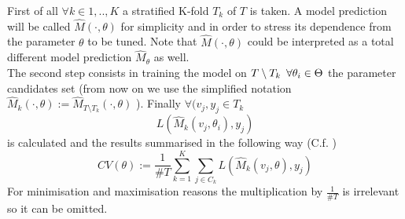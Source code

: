 \documentclass[a4paper,12pt]{article}
\begin{document}
First of all $\forall k \in 1, ..,K$ a stratified K-fold $T_{k}$ of $T$ is taken. A model prediction will be called $ \hat{M}(\cdot,\theta)$ for simplicity and in order to stress its dependence from the parameter $\theta$ to be tuned.
Note that $\hat{M}(\cdot,\theta)$ could be interpreted as a total different model prediction $\hat{M}_{\theta}$ as well.\\
The second step consists in training the model on $T \setminus T_{k} \enskip \forall \theta_{i} \in \Theta $ the parameter candidates set (from now on we use the simplified notation $ \hat{M}_{k}(\cdot,\theta):=\hat{M}_{T \setminus T_{k}}(\cdot,\theta)$ ).
Finally $\forall (v_{j},y_{j} \in T_{k} $  $$ L(\hat{M}_{k}(v_{j},\theta_{i}),y_{j})$$ is calculated and the results summarised in the following way (C.f. \cite{A BIAS CORRECTION FOR THE MINIMUM ERROR RATE IN CROSS-VALIDATION By Ryan J. Tibshirani1 and Robert Tibshirani2 Stanford University and Stanford University} ) $$ CV(\theta):= \frac{1}{\#T} \sum_{k=1}^{K} \sum_{j \in C_{k}} L(\hat{M}_{k}(v_{j},\theta),y_{j})$$
For minimisation and maximisation reasons the multiplication by $\frac{1}{\# T}$ is irrelevant so it can be omitted.
\end{document}
